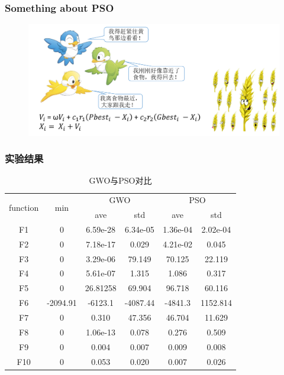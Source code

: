\begin{frame}
	\frametitle{Something about PSO}
		\begin{figure}[htbp]
			\centering
			\includegraphics[width=14cm]{pic/wolf6.png}
		\end{figure}
\end{frame}

\begin{frame}
	\frametitle{实验结果}
	\begin{table}[]
	\centering
	\caption{GWO与PSO对比}
	\label{wolf_table3}
	\begin{tabular}{cccccc}
	\multirow{2}{*}{function} & \multirow{2}{*}{min} & \multicolumn{2}{c}{GWO} & \multicolumn{2}{c}{PSO} \\ \cline{3-6} 
	                          &                      & ave        & std        & ave        & std        \\ \hline
	F1                        & 0                    & 6.59e-28   & 6.34e-05   & 1.36e-04   & 2.02e-04   \\
	F2                        & 0                    & 7.18e-17   & 0.029      & 4.21e-02   & 0.045      \\
	F3                        & 0                    & 3.29e-06   & 79.149     & 70.125     & 22.119     \\
	F4                        & 0                    & 5.61e-07   & 1.315      & 1.086      & 0.317      \\
	F5                        & 0                    & 26.81258   & 69.904     & 96.718     & 60.116     \\
	F6                        & -2094.91             & -6123.1    & -4087.44   & -4841.3    & 1152.814   \\
	F7                        & 0                    & 0.310      & 47.356     & 46.704     & 11.629     \\
	F8                        & 0                    & 1.06e-13   & 0.078      & 0.276      & 0.509      \\
	F9                        & 0                    & 0.004      & 0.007      & 0.009      & 0.008      \\
	F10                       & 0                    & 0.053      & 0.020      & 0.007      & 0.026     
	\end{tabular}
	\end{table}
\end{frame}


